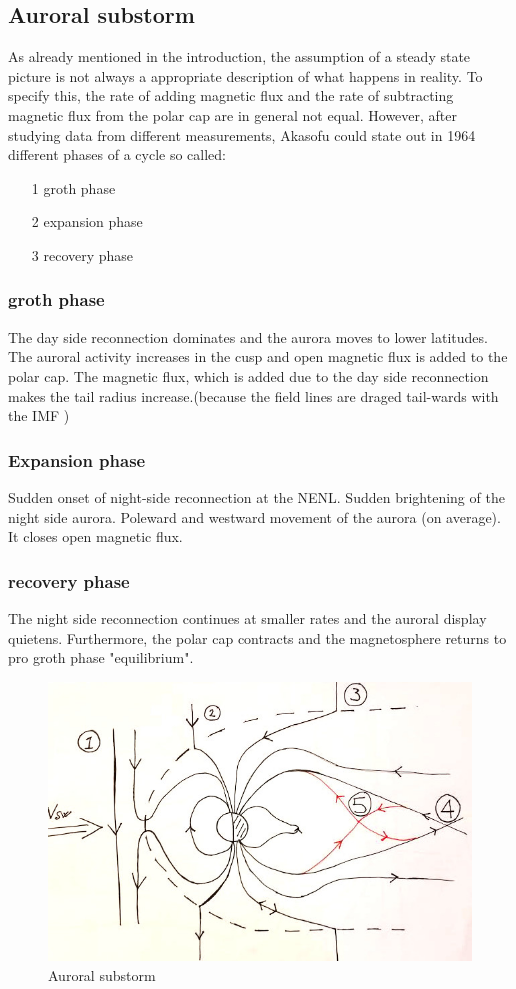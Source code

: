 \documentclass[10pt,a4paper]{article}
\begin{document}
\subsection{Auroral substorm \label{_CHAP_THEO_substorm}}
As already mentioned in the introduction, the assumption of a steady state picture is not always a appropriate description of what happens in reality. To specify this, the rate of adding magnetic flux and the rate of subtracting magnetic flux from the polar cap are in general not equal. However, after studying data from different measurements, Akasofu could state out in 1964 different phases of a cycle so called:
\begin{itemize}
\item[1] groth phase
\item[2] expansion phase
\item[3] recovery phase
\end{itemize}
\subsubsection{groth phase}
The day side reconnection dominates and the aurora moves to lower latitudes. The auroral activity increases in the cusp and open magnetic flux is added to the polar cap. The magnetic flux, which is added due to the day side reconnection makes the tail radius increase.(because the field lines are draged tail-wards with the IMF )
\subsubsection{Expansion phase}
Sudden onset of night-side reconnection at the NENL. Sudden brightening of the night side aurora. Poleward and westward movement of the aurora (on average). It closes open magnetic flux. 
\subsubsection{recovery phase}
The night side reconnection continues at smaller rates and the auroral display quietens. Furthermore, the polar cap contracts and the magnetosphere returns to pro groth phase "equilibrium". 
\begin{figure}[h]
\centering
\caption{Auroral substorm}
\label{aurora substorm}
\includegraphics[scale=0.5]{solvind2.jpg}
\end{figure}
\end{document}
